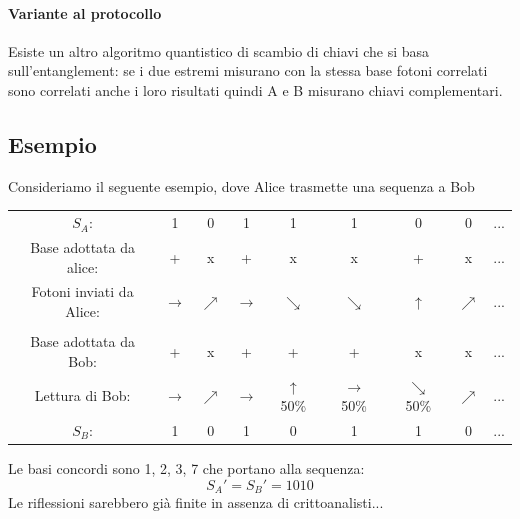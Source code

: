 \paragraph{Variante al protocollo} Esiste un altro algoritmo quantistico di scambio di chiavi che si basa sull'entanglement: se i due estremi misurano con la stessa base fotoni correlati sono correlati anche i loro risultati quindi A e B misurano chiavi complementari.

\subsection{Esempio}
Consideriamo il seguente esempio, dove Alice trasmette una sequenza a Bob
\begin{center}
    \begin{tabular}{c|c c c c c c c c }
        $S_A$: & 1 & 0 & 1 & 1 & 1 & 0 & 0 & ...  \\
        Base adottata da alice: & + & x & + & x & x & + & x & ... \\
        Fotoni inviati da Alice: & $\rightarrow$ & $\nearrow$ & $\rightarrow$ & $\searrow$ & $\searrow$ & $\uparrow$ & $\nearrow$ & ...  \\
    
        & & & & & & & &  \\

        Base adottata da Bob: & + & x & + & + & + & x & x & ...  \\
        Lettura di Bob: & $\rightarrow$ & $\nearrow$ & $\rightarrow$ & $\uparrow$ 50\% & $\rightarrow$ 50\% & $\searrow$ 50\% & $\nearrow$ & ... \\
        $S_B$: & 1 & 0 & 1 & 0 & 1 & 1 & 0 & ...  \\
    \end{tabular}
\end{center}
Le basi concordi sono 1, 2, 3, 7 che portano alla sequenza:
$$ S_A' = S_B' = 1010 $$
Le riflessioni sarebbero già finite in assenza di crittoanalisti...

